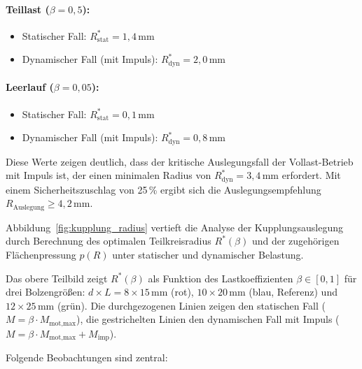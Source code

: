 ﻿\documentclass[a4paper,12pt]{article}
\begin{document}
\paragraph{Teillast ($\beta = 0{,}5$):}
\begin{itemize}
  \item Statischer Fall: $R^*_\text{stat} = 1{,}4\,\text{mm}$
  \item Dynamischer Fall (mit Impuls): $R^*_\text{dyn} = 2{,}0\,\text{mm}$
\end{itemize}

\paragraph{Leerlauf ($\beta = 0{,}05$):}
\begin{itemize}
  \item Statischer Fall: $R^*_\text{stat} = 0{,}1\,\text{mm}$
  \item Dynamischer Fall (mit Impuls): $R^*_\text{dyn} = 0{,}8\,\text{mm}$
\end{itemize}

Diese Werte zeigen deutlich, dass der kritische Auslegungsfall der Vollast-Betrieb
mit Impuls ist, der einen minimalen Radius von $R^*_\text{dyn} = 3{,}4\,\text{mm}$
erfordert. Mit einem Sicherheitszuschlag von 25\,\% ergibt sich die
Auslegungsempfehlung $R_\text{Auslegung} \geq 4{,}2\,\text{mm}$.

Abbildung~\ref{fig:kupplung_radius} vertieft die Analyse der Kupplungsauslegung
durch Berechnung des optimalen Teilkreisradius $R^*(\beta)$ und der zugehörigen
Flächenpressung $p(R)$ unter statischer und dynamischer Belastung.

Das obere Teilbild zeigt $R^*(\beta)$ als Funktion des Lastkoeffizienten
$\beta \in [0, 1]$ für drei Bolzengrößen: $d \times L = 8 \times 15\,\text{mm}$
(rot), $10 \times 20\,\text{mm}$ (blau, Referenz) und $12 \times 25\,\text{mm}$
(grün). Die durchgezogenen Linien zeigen den statischen Fall
($M = \beta \cdot M_\text{mot,max}$), die gestrichelten Linien den dynamischen
Fall mit Impuls ($M = \beta \cdot M_\text{mot,max} + M_\text{imp}$).

Folgende Beobachtungen sind zentral:
\end{document}
